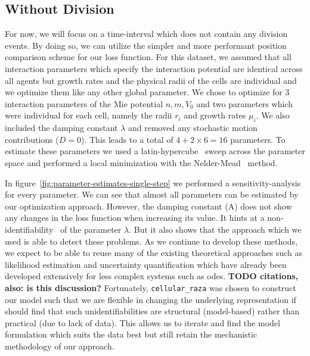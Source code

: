 \documentclass{article}
\begin{document}
\subsection{Without Division}
For now, we will focus on a time-interval which does not contain any division events.
By doing so, we can utilize the simpler and more performant position comparison scheme for our loss
function.
For this dataset, we assumed that all interaction parameters which specify the interaction
potential are identical across all agents but growth rates and the physical radii of the cells are
individual and we optimize them like any other global parameter.
We chose to optimize for 3 interaction parameters of the Mie potential $n,m,V_0$ and two parameters
which were individual for each cell, namely the radii $r_i$ and growth rates $\mu_i$.
We also included the damping constant $\lambda$ and removed any stochastic motion contributions
($D=0$).
This leads to a total of $4+2\times 6=16$ parameters.
To estimate these parameters we used a latin-hypercube~\cite{McKay1979} sweep across the parameter
space and performed a local minimization with the Nelder-Mead~\cite{Powell1973} method.

In figure~\ref{fig:parameter-estimates-single-step} we performed a sensitivity-analysis for every
parameter.
We can see that almost all parameters can be estimated by our optimization approach.
However, the damping constant (A) does not show any changes in the loss function when increasing its
value.
It hints at a non-identifiability~\cite{Raue2009} of the parameter $\lambda$.
But it also shows that the approach which we used is able to detect these problems.
As we continue to develop these methods, we expect to be able to reuse many of the existing
theoretical approaches such as likelihood estimation and uncertainty quantification which have
already been developed extensively for less complex systems such as \acp{ode}.
\textbf{TODO citations, also: is this discussion?}
Fortunately, \texttt{cellular\_raza} was chosen to construct our model such that we are flexible in
changing the underlying representation if should find that such unidentifiabilities are structural
(model-based) rather than practical (due to lack of data).
This allows us to iterate and find the model formulation which suits the data best but still retain
the mechanistic methodology of our approach.
\end{document}
